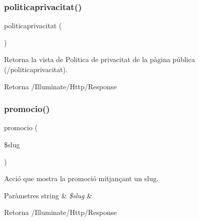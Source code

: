 \subsubsection{\texorpdfstring{politicaprivacitat()}{politicaprivacitat()}}
{\footnotesize\ttfamily politicaprivacitat (\begin{DoxyParamCaption}{ }\end{DoxyParamCaption})}

Retorna la vista de Politica de privacitat de la pàgina pública (/politicaprivacitat).

\begin{DoxyReturn}{Retorna}
/\+Illuminate/\+Http/\+Response 
\end{DoxyReturn}
\mbox{\label{class_app_1_1_http_1_1_controllers_1_1_home_controller_a80ff321acb2def7f4917effa7b4de5c8}} 
\subsubsection{\texorpdfstring{promocio()}{promocio()}}
{\footnotesize\ttfamily promocio (\begin{DoxyParamCaption}\item[{}]{\$slug }\end{DoxyParamCaption})}

Acció que mostra la promoció mitjançant un slug.


\begin{DoxyParams}[1]{Paràmetres}
string & {\em \$slug} & \\
\hline
\end{DoxyParams}
\begin{DoxyReturn}{Retorna}
/\+Illuminate/\+Http/\+Response 
\end{DoxyReturn}
\mbox{\label{class_app_1_1_http_1_1_controllers_1_1_home_controller_af075ef8c6ea5491e8e8005d79c985317}} 
